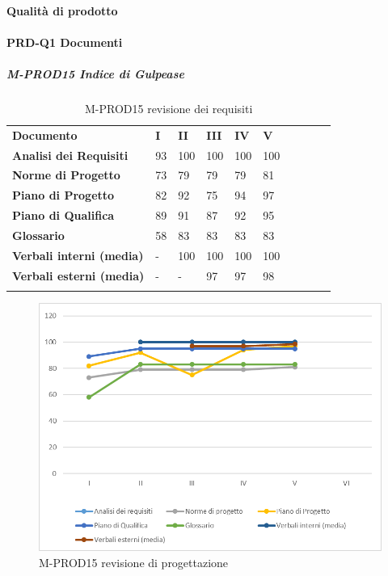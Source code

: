 \paragraph{Qualità di prodotto}
\paragraph*{PRD-Q1 Documenti}
\subparagraph{M-PROD15 Indice di Gulpease}\mbox{}
\begin{longtable} {						
		>{}p{50mm}  		
		>{}p{8mm}		
		>{}p{8mm}		
		>{}p{8mm}		
		>{}p{8mm}		
		>{}p{8mm}		
		>{}p{8mm}
		>{}p{8mm}
		>{}p{8mm}
		>{}p{8mm}				
	}			
	\rowcolor{gray!50}
	\textbf{Documento} & \textbf{I} & \textbf{II} & \textbf{III} & \textbf{IV} & \textbf{V} \TBstrut \\ [2mm]
	\textbf{Analisi dei Requisiti} & 93 & 100 & 100 & 100 & 100 \TBstrut \\ [2mm]
	\textbf{Norme di Progetto} & 73 & 79 & 79 & 79 & 81 \TBstrut \\ [2mm]
	\textbf{Piano di Progetto} & 82 & 92 & 75 & 94 & 97 \TBstrut \\ [2mm]
	\textbf{Piano di Qualifica} & 89 & 91 & 87 & 92 & 95 \TBstrut \\ [2mm]
	\textbf{Glossario} & 58 & 83 & 83 & 83 & 83 \TBstrut \\ [2mm]
	\textbf{Verbali interni (media)} & - & 100 & 100 & 100 & 100 \TBstrut \\ [2mm]
	\textbf{Verbali esterni (media)} & - & - & 97 & 97 & 98 \TBstrut \\ [2mm]
	\rowcolor{white}
	\caption{M-PROD15 revisione dei requisiti}
\end{longtable}
\begin{figure}[H] 	
	\includegraphics[width=\linewidth]{./img/grafici/RP18.png}	
	\caption{M-PROD15 revisione di progettazione}	
\end{figure}
